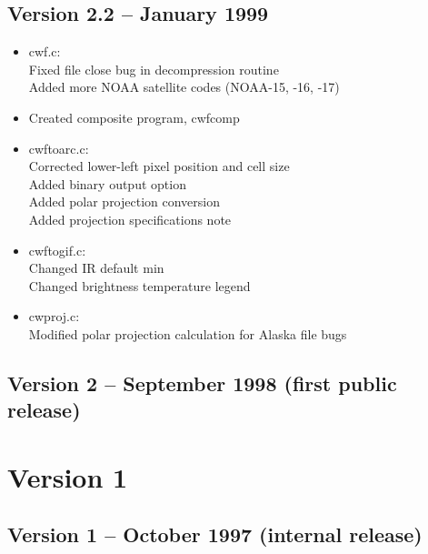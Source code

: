 
\subsection*{Version 2.2 -- January 1999}

\begin{itemize}

  \item cwf.c:\\
  Fixed file close bug in decompression routine\\
  Added more NOAA satellite codes (NOAA-15, -16, -17)

  \item Created composite program, cwfcomp

  \item cwftoarc.c:\\
  Corrected lower-left pixel position and cell size\\
  Added binary output option\\
  Added polar projection conversion\\
  Added projection specifications note

  \item cwftogif.c:\\
  Changed IR default min\\
  Changed brightness temperature legend

  \item cwproj.c:\\
  Modified polar projection calculation for Alaska file bugs\\

\end{itemize}


\subsection*{Version 2 -- September 1998 (first public release)}


\section{Version 1}


\subsection*{Version 1 -- October 1997 (internal release)}

